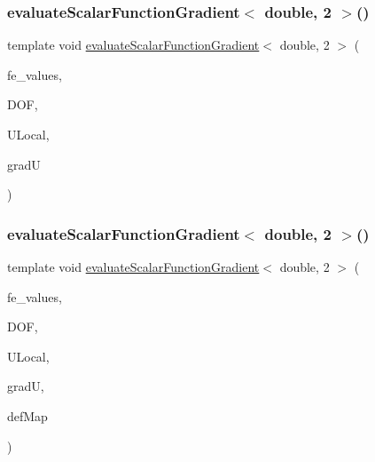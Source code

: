 \mbox{\label{function_evaluations_8cc_aebfcd53aa3d6ed1aade3f0a3b404e790}} 
\subsubsection{\texorpdfstring{evaluate\+Scalar\+Function\+Gradient$<$ double, 2 $>$()}{evaluateScalarFunctionGradient< double, 2 >()}\hspace{0.1cm}{\footnotesize\ttfamily [1/4]}}
{\footnotesize\ttfamily template void \mbox{\hyperlink{group___evaluation_functions_gabedd4ae2841d2332ed0df0513b189e34}{evaluate\+Scalar\+Function\+Gradient}}$<$ double, 2 $>$ (\begin{DoxyParamCaption}\item[{const F\+E\+Values$<$ 2 $>$ \&}]{fe\+\_\+values,  }\item[{unsigned int}]{D\+OF,  }\item[{Table$<$ 1, double $>$ \&}]{U\+Local,  }\item[{Table$<$ 2, double $>$ \&}]{gradU }\end{DoxyParamCaption})}

\mbox{\label{function_evaluations_8cc_a22ad018eab8d203fd930ad1209435d89}} 
\subsubsection{\texorpdfstring{evaluate\+Scalar\+Function\+Gradient$<$ double, 2 $>$()}{evaluateScalarFunctionGradient< double, 2 >()}\hspace{0.1cm}{\footnotesize\ttfamily [2/4]}}
{\footnotesize\ttfamily template void \mbox{\hyperlink{group___evaluation_functions_gabedd4ae2841d2332ed0df0513b189e34}{evaluate\+Scalar\+Function\+Gradient}}$<$ double, 2 $>$ (\begin{DoxyParamCaption}\item[{const F\+E\+Values$<$ 2 $>$ \&}]{fe\+\_\+values,  }\item[{unsigned int}]{D\+OF,  }\item[{Table$<$ 1, double $>$ \&}]{U\+Local,  }\item[{Table$<$ 2, double $>$ \&}]{gradU,  }\item[{\mbox{\hyperlink{structdeformation_map}{deformation\+Map}}$<$ double, 2 $>$ \&}]{def\+Map }\end{DoxyParamCaption})}

